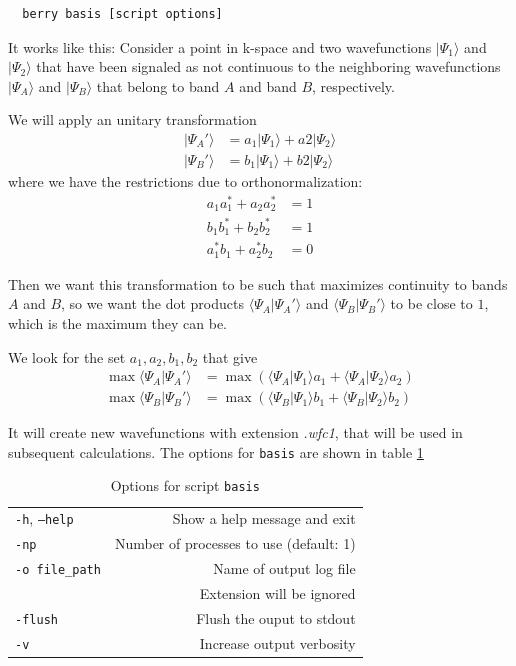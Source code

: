 \documentclass[a4paper,12pt]{report}
\begin{document}
 \begin{verbatim}
  berry basis [script options]
 \end{verbatim}

 It works like this:
 Consider a point in k-space and two wavefunctions $|\Psi_1\rangle$ and $|\Psi_2\rangle$
 that have been signaled as not continuous to the neighboring wavefunctions $|\Psi_A\rangle$ and $|\Psi_B\rangle$
 that belong to band $A$ and band $B$, respectively.

 We will apply an unitary transformation
 \begin{align*}
  |\Psi_A'\rangle &= a_1|\Psi_1\rangle + a2|\Psi_2\rangle \\
  |\Psi_B'\rangle &= b_1|\Psi_1\rangle + b2|\Psi_2\rangle
 \end{align*}
 where we have the restrictions due to orthonormalization:
 \begin{align*}
  a_1a_1^* + a_2a_2^* &= 1\\
  b_1b_1^* + b_2b_2^* &= 1\\
  a_1^*b_1 + a_2^*b_2 &= 0
 \end{align*}

 Then we want this transformation to be such that maximizes continuity to bands $A$ and $B$, so we want
 the dot products $\langle \Psi_A|\Psi_A'\rangle $ and $\langle \Psi_B|\Psi_B'\rangle $ to be close to $1$,
 which is the maximum they can be.

 We look for the set $a_1, a_2, b_1, b_2$ that give
 \begin{align*}
  \max \langle \Psi_A|\Psi_A'\rangle &= \max \left( \langle \Psi_A|\Psi_1\rangle a_1 + \langle \Psi_A|\Psi_2\rangle a_2\right) \\
  \max \langle \Psi_B|\Psi_B'\rangle &= \max \left( \langle \Psi_B|\Psi_1\rangle b_1 + \langle \Psi_B|\Psi_2\rangle b_2\right)
 \end{align*}

 It will create new wavefunctions with extension \emph{.wfc1}, that will be used in subsequent calculations.
The options for \texttt{basis} are shown in table \ref{tab:options_basis}

\begin{table}[h]
 \centering
 \caption{Options for script \texttt{basis}}\label{tab:options_basis}
 \begin{tabular}[]{lr}
 \hline
  \texttt{-h}, \texttt{--help}  &\hspace*{2cm} Show a help message and exit \\
  \texttt{-np}                  & Number of processes to use (default: 1) \\
  \texttt{-o file\_path}        & Name of output log file\\
                                & Extension will be ignored \\
  \texttt{-flush}               & Flush the ouput to stdout \\
  \texttt{-v}                   & Increase output verbosity \\
  \hline
 \end{tabular}
\end{table}
\end{document}
